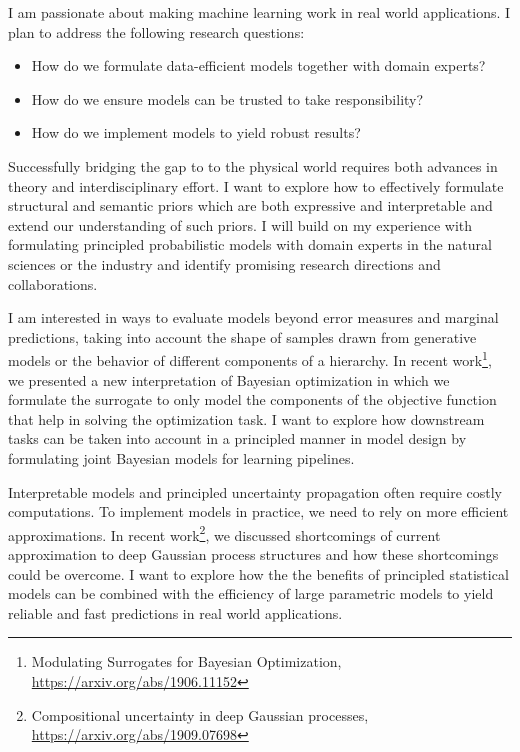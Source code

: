 I am passionate about making machine learning work in real world applications.
I plan to address the following research questions:
\begin{itemize}
    \item How do we formulate data-efficient models together with domain experts?
    \item How do we ensure models can be trusted to take responsibility?
    \item How do we implement models to yield robust results?
\end{itemize}
Successfully bridging the gap to to the physical world requires both advances in theory and interdisciplinary effort.
I want to explore how to effectively formulate structural and semantic priors which are both expressive and interpretable and extend our understanding of such priors.
I will build on my experience with formulating principled probabilistic models with domain experts in the natural sciences or the industry and identify promising research directions and collaborations.

I am interested in ways to evaluate models beyond error measures and marginal predictions, taking into account the shape of samples drawn from generative models or the behavior of different components of a hierarchy.
In recent work\footnote{Modulating Surrogates for Bayesian Optimization, \url{https://arxiv.org/abs/1906.11152}}, we presented a new interpretation of Bayesian optimization in which we formulate the surrogate to only model the components of the objective function that help in solving the optimization task.
I want to explore how downstream tasks can be taken into account in a principled manner in model design by formulating joint Bayesian models for learning pipelines.

Interpretable models and principled uncertainty propagation often require costly computations.
To implement models in practice, we need to rely on more efficient approximations.
In recent work\footnote{Compositional uncertainty in deep Gaussian processes, \url{https://arxiv.org/abs/1909.07698}}, we discussed shortcomings of current approximation to deep Gaussian process structures and how these shortcomings could be overcome.
I want to explore how the the benefits of principled statistical models can be combined with the efficiency of large parametric models to yield reliable and fast predictions in real world applications.

